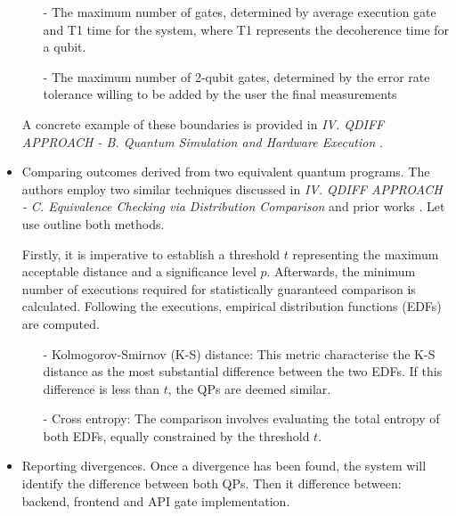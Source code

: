 \begin{itemize}
    \begin{itemize}
        \item[-] The maximum number of gates, determined by average execution gate and T1 time for the system, where T1 represents the decoherence time for a qubit. 
        \item[-] The maximum number of 2-qubit gates, determined by the error rate tolerance willing to be added by the user  the final measurements 
    \end{itemize}

    A concrete example of these boundaries is provided in \textit{IV. QDIFF APPROACH - B. Quantum Simulation and Hardware Execution} \cite{wang2021qdiff}.

    \item Comparing outcomes derived from two equivalent quantum programs. The authors employ two similar techniques discussed in \textit{IV. QDIFF APPROACH - C. Equivalence Checking via Distribution Comparison} \cite{wang2021qdiff} and prior works \cite{chan2014optimal}\cite{aaronson2016complexity}\cite{cross2019validating}. Let use outline both methods.\newline
    
    Firstly, it is imperative to establish a threshold $t$ representing the maximum acceptable distance and a significance level $p$. Afterwards, the minimum number of executions required for statistically guaranteed comparison is calculated. Following the executions, empirical distribution functions (EDFs) are computed.

    \begin{itemize}
        \item[-] Kolmogorov-Smirnov (K-S) distance: This metric characterise the K-S distance as the most substantial difference between the two EDFs. If this difference is less than $t$, the QPs are deemed similar.
        \item[-] Cross entropy: The comparison involves evaluating the total entropy of both EDFs, equally constrained by the threshold $t$.
    \end{itemize}

    \item Reporting divergences. Once a divergence has been found, the system will identify the difference between both QPs. Then it difference between: backend, frontend and API gate implementation.
    

\end{itemize}
